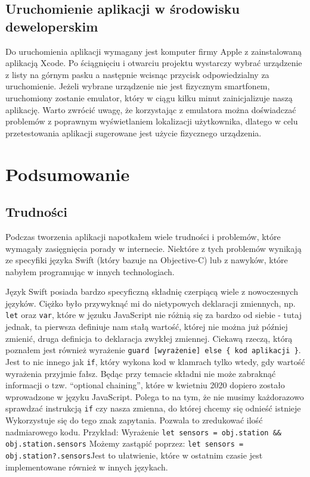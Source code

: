 \documentclass[a4paper,11pt,titlepage]{article}
\begin{document}
\subsection{Uruchomienie aplikacji w środowisku deweloperskim}
Do uruchomienia aplikacji wymagany jest komputer firmy Apple z zainstalowaną aplikacją Xcode. Po ściągnięciu i otwarciu projektu wystarczy wybrać urządzenie z listy na górnym pasku a następnie wcisnąc przycisk odpowiedzialny za uruchomienie. Jeżeli wybrane urządzenie nie jest fizycznym smartfonem, uruchomiony zostanie emulator, który w ciągu kilku minut zainicjalizuje naszą aplikację. Warto zwrócić uwagę, że korzystając z emulatora można doświadczać problemów z poprawnym wyświetlaniem lokalizacji użytkownika, dlatego w celu przetestowania aplikacji sugerowane jest użycie fizycznego urządzenia.


\section{Podsumowanie}
\subsection{Trudności}
Podczas tworzenia aplikacji napotkałem wiele trudności i problemów, które wymagały zasięgnięcia porady w internecie. Niektóre z tych problemów wynikają ze specyfiki języka Swift (który bazuje na Objective-C) lub z nawyków, które nabyłem programując w innych technologiach.

Język Swift posiada bardzo specyficzną składnię czerpiącą wiele z nowoczesnych języków. Ciężko było przywyknąć mi do nietypowych deklaracji zmiennych, np. \verb|let| oraz \verb|var|, które w jęzuku JavaScript nie różnią się za bardzo od siebie - tutaj jednak, ta pierwsza definiuje nam stałą wartość, której nie można już później zmienić, druga definicja to deklaracja zwykłej zmiennej. Ciekawą rzeczą, którą poznałem jest również wyrażenie \newline \verb|guard [wyrażenie] else { kod aplikacji }|. Jest to nic innego jak \verb|if|, który wykona kod w klamrach tylko wtedy, gdy wartość wyrażenia przyjmie fałsz. Będąc przy temacie składni nie może zabraknąć informacji o tzw. ``optional chaining'', które w kwietniu 2020 dopiero zostało wprowadzone w języku JavaScript. Polega to na tym, że nie musimy każdorazowo sprawdzać instrukcją \verb|if| czy nasza zmienna, do której chcemy się odnieść istnieje Wykorzystuje się do tego znak zapytania. Pozwala to zredukować ilość nadmiarowego kodu. Przykład:\newline
Wyrażenie \verb|let sensors = obj.station && obj.station.sensors| \newline
Możemy zastąpić poprzez: \verb|let sensors = obj.station?.sensors|\newline Jest to ułatwienie, które w ostatnim czasie jest implementowane również w innych językach.
\end{document}
